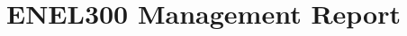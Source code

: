 \documentclass{article}
\title{ENEL300 Management Report}
\begin{document}
\maketitle{}
\end{document}
